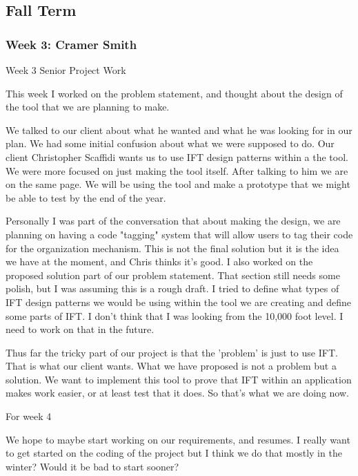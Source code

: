 \subsection{Fall Term}
\subsubsection{Week 3: Cramer Smith}

Week 3 Senior Project Work



This week I worked on the problem statement, and thought about the design of the tool that we are planning to make.



We talked to our client about what he wanted and what he was looking for in our plan. We had some initial confusion about what we were supposed to do. Our client Christopher Scaffidi wants us to use IFT design patterns within a the tool. We were more focused on just making the tool itself. After talking to him we are on the same page. We will be using the tool and make a prototype that we might be able to test by the end of the year. 



Personally I was part of the conversation that about making the design, we are planning on having a code "tagging" system that will allow users to tag their code for the organization mechanism. This is not the final solution but it is the idea we have at the moment, and Chris thinks it's good. I also worked on the proposed solution part of our problem statement. That section still needs some polish, but I was assuming this is a rough draft. I tried to define what types of IFT design patterns we would be using within the tool we are creating and define some parts of IFT. I don't think that I was looking from the 10,000 foot level. I need to work on that in the future.



Thus far the tricky part of our project is that the 'problem' is just to use IFT. That is what our client wants. What we have proposed is not a problem but a solution. We want to implement this tool to prove that IFT within an application makes work easier, or at least test that it does. So that's what we are doing now. 



For week 4



We hope to maybe start working on our requirements, and resumes. I really want to get started on the coding of the project but I think we do that mostly in the winter? Would it be bad to start sooner?  \\ 

